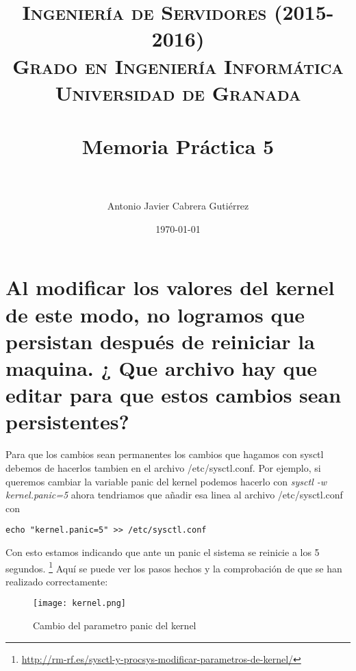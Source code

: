 


\title{	
\normalfont \normalsize 
\textsc{{\bf Ingeniería de Servidores (2015-2016)} \\ Grado en Ingeniería Informática \\ Universidad de Granada} \\ [25pt] %
\horrule{0.5pt} \\[0.4cm] %
\huge Memoria Práctica 5 \\ %
\horrule{2pt} \\[0.5cm] %
}

\author{Antonio Javier Cabrera Gutiérrez } %

\date{\normalsize\today} %




\maketitle %

\newpage %

\tableofcontents %

\listoffigures
\listoftables


\newpage

\section{Al modificar los valores del kernel de este modo, no logramos que persistan después de reiniciar la maquina. ¿ Que archivo hay que editar para que estos cambios sean persistentes?}
Para que los cambios sean permanentes los cambios que hagamos con sysctl debemos de hacerlos tambien en el archivo /etc/sysctl.conf. Por ejemplo, si queremos cambiar la variable panic del kernel podemos hacerlo con \textit{sysctl -w kernel.panic=5} ahora tendriamos que añadir esa linea al archivo /etc/sysctl.conf con \begin{verbatim}echo "kernel.panic=5" >> /etc/sysctl.conf 
\end{verbatim} Con esto estamos indicando que ante un panic el sistema se reinicie a los 5 segundos. \footnote{\url{http://rm-rf.es/sysctl-y-procsys-modificar-parametros-de-kernel/}}
Aquí se puede ver los pasos hechos y la comprobación de que se han realizado correctamente:
\begin{figure}[H] 
\centering
\texttt{[image: kernel.png]}  
\label{figura1:}
\caption{Cambio del parametro panic del kernel}
\end{figure}
